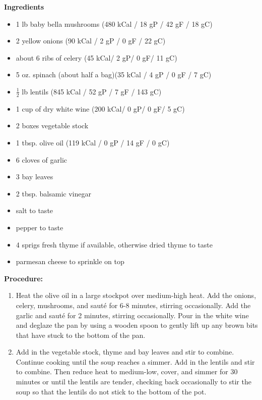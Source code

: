 \begin{multicols}{2}
\textbf{Ingredients}
\begin{itemize}
\item 1 lb baby bella mushrooms \newline (480 kCal / 18 gP / 42 gF / 18 gC)

\item 2 yellow onions \quad (90 kCal / 2 gP / 0 gF / 22 gC)
\item about 6 ribs of celery \quad (45 kCal/ 2 gP/ 0 gF/ 11 gC)
\item 5 oz. spinach (about half a bag)\newline (35 kCal / 4 gP / 0 gF / 7 gC)
\item $\frac{1}{2}$ lb lentils \quad (845 kCal / 52 gP / 7 gF / 143 gC)
\item 1 cup of dry white wine \quad (200 kCal/ 0 gP/ 0 gF/ 5 gC)
\item 2 boxes vegetable stock
\item 1 tbsp. olive oil \quad (119 kCal / 0 gP / 14 gF / 0 gC)
\item 6 cloves of garlic
\item 3 bay leaves
\item 2 tbsp. balsamic vinegar
\item salt to taste
\item pepper to taste
\item 4 sprigs fresh thyme if available, otherwise dried thyme to taste
\item parmesan cheese to sprinkle on top 


\end{itemize}


\columnbreak
\textbf{Procedure:}
\medskip


\begin{enumerate}
\item Heat the olive oil in a large stockpot over medium-high heat.  Add the onions, celery, mushrooms, and sauté for 6-8 minutes, stirring occasionally.  Add the garlic and sauté for 2 minutes, stirring occasionally.  Pour in the white wine and deglaze the pan by using a wooden spoon to gently lift up any brown bits that have stuck to the bottom of the pan. 

\item Add in the vegetable stock, thyme and bay leaves and stir to combine.  Continue cooking until the soup reaches a simmer.  Add in the lentils and stir to combine.  Then reduce heat to medium-low, cover, and simmer for 30 minutes or until the lentils are tender, checking back occasionally to stir the soup so that the lentils do not stick to the bottom of the pot.


\end{enumerate}
\end{multicols}
